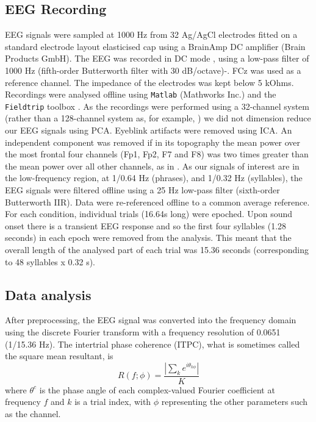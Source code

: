 \documentclass[10pt,letterpaper]{article}
\newcommand{\citet}[1]{\cite{#1}}
\begin{document}
\subsection*{EEG Recording}
 
EEG signals were sampled at 1000 Hz from 32 Ag/AgCl electrodes fitted
on a standard electrode layout elasticised cap using a BrainAmp DC
amplifier (Brain Products GmbH). The EEG was recorded in DC mode ,
using a low-pass filter of 1000 Hz (fifth-order Butterworth filter
with 30 dB/octave)-. FCz was used as a reference channel. The
impedance of the electrodes was kept below 5 kOhms. Recordings were
analysed offline using \texttt{Matlab} (Mathworks Inc.) and the
\texttt{Fieldtrip} toolbox \cite{FieldTrip}. As the recordings were
performed using a 32-channel system (rather than a 128-channel system
as, for example, \citet{DingEtAl2017}) we did not dimension reduce our
EEG signals using PCA. Eyeblink artifacts were removed using ICA. An
independent component was removed if in its topography the mean power
over the most frontal four channels (Fp1, Fp2, F7 and F8) was two
times greater than the mean power over all other channels, as in
\citet{DingEtAl2017}. As our signals of interest are in the
low-frequency region, at 1/0.64 Hz (phrases), and 1/0.32 Hz
(syllables), the EEG signals were filtered offline using a 25 Hz
low-pass filter (sixth-order Butterworth IIR). Data were re-referenced
offline to a common average reference. For each condition, individual
trials (16.64s long) were epoched. Upon sound onset there is a
transient EEG response and so the first four syllables (1.28 seconds)
in each epoch were removed from the analysis. This meant that the
overall length of the analysed part of each trial was 15.36 seconds
(corresponding to 48 syllables x 0.32 s).

\subsection*{Data analysis}

After preprocessing, the EEG signal was converted into the frequency
domain using the discrete Fourier transform with a frequency
resolution of 0.0651 (1/15.36 Hz). The intertrial phase coherence
(ITPC), what is sometimes called the square mean resultant, is
\begin{equation}
\label{eq:itpc}
R(f;\phi)=\frac{\left|\sum_k e^{i\theta_{k\phi}}\right|}{K}
\end{equation}
where $\theta^c$ is the phase angle of each complex-valued Fourier
coefficient at frequency $f$ and $k$ is a trial index, with $\phi$
representing the other parameters such as the channel.
\end{document}

